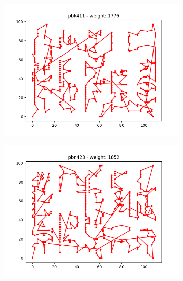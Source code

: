 \documentclass{article}
\def\v{0.4}
\begin{document}
\begin{figure}[h!]
	\centering
	\begin{subfigure}[b]{\v\linewidth}
		\includegraphics[width=\linewidth]{graphs/TSP_pbk411.png}
	\end{subfigure}
	\begin{subfigure}[b]{\v\linewidth}
		\includegraphics[width=\linewidth]{graphs/TSP_pbn423.png}
	\end{subfigure}
	\begin{subfigure}[b]{\v\linewidth}

\end{subfigure}
\end{figure}
\end{document}
